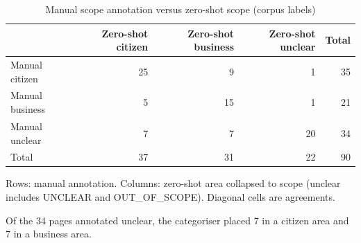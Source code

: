 \begin{table}[htbp]
\centering
\begin{threeparttable}
\caption{Manual scope annotation versus zero-shot scope (corpus labels)}
\label{tab:zeroshot-confusion}
\begin{tabular}{lrrrr}
\hline
 & Zero-shot citizen & Zero-shot business & Zero-shot unclear & Total \\
\hline
Manual citizen & 25 & 9 & 1 & 35 \\
Manual business & 5 & 15 & 1 & 21 \\
Manual unclear & 7 & 7 & 20 & 34 \\
\hline
Total & 37 & 31 & 22 & 90 \\
\hline
\end{tabular}
\begin{tablenotes}
\footnotesize
\item Rows: manual annotation. Columns: zero-shot area collapsed to scope (unclear includes UNCLEAR and OUT\_OF\_SCOPE). Diagonal cells are agreements.
\item Of the 34 pages annotated unclear, the categoriser placed 7 in a citizen area and 7 in a business area.
\end{tablenotes}
\end{threeparttable}
\end{table}

